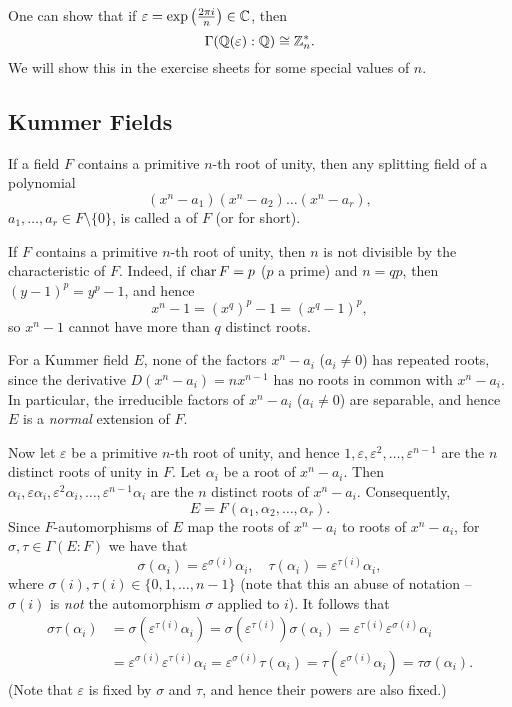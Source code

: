 \begin{remark}
	One can show that if $\varepsilon = \exp\left(\frac{2\pi i}{n}\right) \in \mathbb{C}$, then
	\[
		\Gamma(\mathbb{Q}(\varepsilon) : \mathbb{Q}) \cong \mathbb{Z}_n^*.
	\]
	We will show this in the exercise sheets for some special values of $n$.
\end{remark}

\subsection{Kummer Fields}
If a field $F$ contains a primitive $n$-th root of unity, then any splitting field of a polynomial
\[
	(x^n - a_1)(x^n - a_2)\dots(x^n - a_r),
\]
$a_1, \dots, a_r \in F \setminus \{0\}$, is called a  of $F$ (or  for short).

\begin{remark}
	If $F$ contains a primitive $n$-th root of unity, then $n$ is not divisible by the characteristic of $F$. Indeed, if $\operatorname{char}{F} = p$ ($p$ a prime) and $n = qp$, then $(y - 1)^p = y^p - 1$, and hence
	\[
		x^n - 1 = (x^q)^p - 1 = (x^q - 1)^p,
	\]
	so $x^n - 1$ cannot have more than $q$ distinct roots.
\end{remark}

For a Kummer field $E$, none of the factors $x^n - a_i$ ($a_i \neq 0$) has repeated roots, since the derivative $D(x^n - a_i) = nx^{n - 1}$ has no roots in common with $x^n - a_i$. In particular, the irreducible factors of $x^n - a_i$ ($a_i \neq 0$) are separable, and hence $E$ is a \emph{normal} extension of $F$.

Now let $\varepsilon$ be a primitive $n$-th root of unity, and hence $1, \varepsilon, \varepsilon^2, \dots, \varepsilon^{n - 1}$ are the $n$ distinct roots of unity in $F$. Let $\alpha_i$ be a root of $x^n - a_i$. Then $\alpha_i, \varepsilon\alpha_i, \varepsilon^2 \alpha_i, \dots, \varepsilon^{n - 1} \alpha_i$ are the $n$ distinct roots of $x^n - a_i$. Consequently,
\[
	E = F(\alpha_1, \alpha_2, \dots, \alpha_r).
\]
Since $F$-automorphisms of $E$ map the roots of $x^n - a_i$ to roots of $x^n - a_i$, for $\sigma, \tau \in \Gamma(E : F)$ we have that
\[
	\sigma(\alpha_i) = \varepsilon^{\sigma(i)} \alpha_i, \quad \tau(\alpha_i) = \varepsilon^{\tau(i)} \alpha_i,
\]
where $\sigma(i), \tau(i) \in \{0, 1, \dots, n - 1\}$ (note that this an abuse of notation -- $\sigma(i)$ is \emph{not} the automorphism $\sigma$ applied to $i$). It follows that
\begin{align*}
	\sigma\tau(\alpha_i) &= \sigma(\varepsilon^{\tau(i)} \alpha_i) = \sigma(\varepsilon^{\tau(i)}) \sigma(\alpha_i) = \varepsilon^{\tau(i)} \varepsilon^{\sigma(i)} \alpha_i \\
		&= \varepsilon^{\sigma(i)} \varepsilon^{\tau(i)} \alpha_i = \varepsilon^{\sigma(i)} \tau(\alpha_i) = \tau(\varepsilon^{\sigma(i)} \alpha_i) = \tau\sigma(\alpha_i).
\end{align*}
(Note that $\varepsilon$ is fixed by $\sigma$ and $\tau$, and hence their powers are also fixed.)

